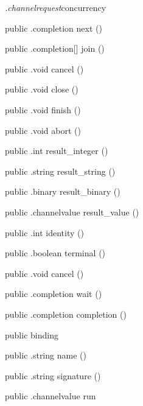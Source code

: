\begin{CrexxClass}{\textit{.channelrequest}}{concurrency}
\begin{Members}
    \Method
      {public}
      {.completion}
      {next}
      {()}

    \Method
      {public}
      {.completion[]}
      {join}
      {()}

    \Method
      {public}
      {.void}
      {cancel}
      {()}

    \Method
      {public}
      {.void}
      {close}
      {()}

    \Method
      {public}
      {.void}
      {finish}
      {()}

    \Method
      {public}
      {.void}
      {abort}
      {()}

    \Method
      {public}
      {.int}
      {result\_integer}
      {()}

    \Method
      {public}
      {.string}
      {result\_string}
      {()}

    \Method
      {public}
      {.binary}
      {result\_binary}
      {()}

    \Method
      {public}
      {.channelvalue}
      {result\_value}
      {()}

    \Method
      {public}
      {.int}
      {identity}
      {()}

    \Method
      {public}
      {.boolean}
      {terminal}
      {()}

    \Method
      {public}
      {.void}
      {cancel}
      {()}

    \Method
      {public}
      {.completion}
      {wait}
      {()}

    \Method
      {public}
      {.completion}
      {completion}
      {()}

    \Factory
      {public}
      {binding}
      {}

    \Method
      {public}
      {.string}
      {name}
      {()}

    \Method
      {public}
      {.string}
      {signature}
      {()}

    \Method
      {public}
      {.channelvalue}
      {run}
      {}


\end{Members}
\end{CrexxClass}
